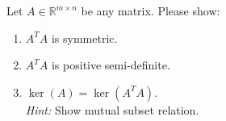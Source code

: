 Let $A \in  \mathbb{R}^{m \times n}$ be any matrix. Please show:
\begin{enumerate}
	\item $A^TA$ is symmetric.
	\item $A^TA$ is positive semi-definite.
	\item $\ker(A) = \ker(A^TA)$.	\\
	\textit{Hint:} Show mutual subset relation.
\end{enumerate}

